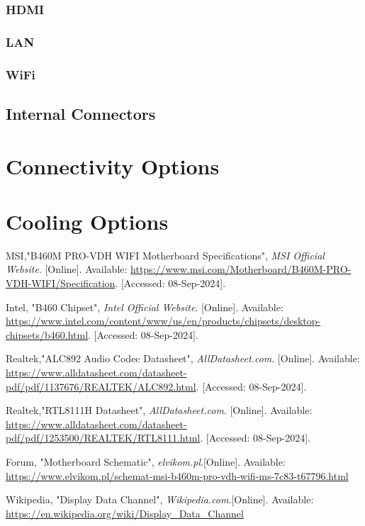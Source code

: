 \documentclass{article}
\begin{document}
\subsubsection{HDMI}
\subsubsection{LAN}
\subsubsection{WiFi}

\subsection{Internal Connectors}


\section{Connectivity Options}

\section{Cooling Options}



\begin{thebibliography}{9}

	MSI,"B460M PRO-VDH WIFI Motherboard Specifications", 
	\textit{MSI Official Website}. [Online]. Available: 
	\url{https://www.msi.com/Motherboard/B460M-PRO-VDH-WIFI/Specification}. [Accessed: 08-Sep-2024].
	
	Intel, "B460 Chipset", 
	\textit{Intel Official Website}. [Online]. Available: 
	\url{https://www.intel.com/content/www/us/en/products/chipsets/desktop-chipsets/b460.html}. [Accessed: 08-Sep-2024].
	
	Realtek,"ALC892 Audio Codec Datasheet", 
	\textit{AllDatasheet.com}. [Online]. Available: 
	\url{https://www.alldatasheet.com/datasheet-pdf/pdf/1137676/REALTEK/ALC892.html}. [Accessed: 08-Sep-2024].
	
	Realtek,"RTL8111H Datasheet", 
	\textit{AllDatasheet.com}. [Online]. Available: 
	\url{https://www.alldatasheet.com/datasheet-pdf/pdf/1253500/REALTEK/RTL8111.html}. [Accessed: 08-Sep-2024].

	Forum, "Motherboard Schematic",
	\textit{elvikom.pl}.[Online]. Available:
	\url{https://www.elvikom.pl/schemat-msi-b460m-pro-vdh-wifi-ms-7c83-t67796.html}

	Wikipedia, "Display Data Channel",
	\textit{Wikipedia.com}.[Online]. Available:
	\url{https://en.wikipedia.org/wiki/Display_Data_Channel}

\end{thebibliography}
	
\end{document}
